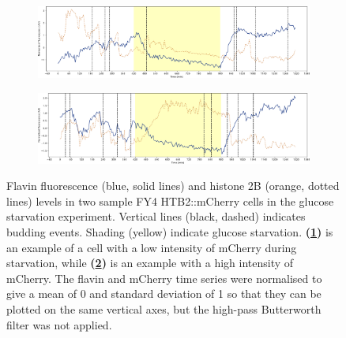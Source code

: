 \begin{figure}
  \centering
  \begin{subfigure}[htpb]{1.0\textwidth}
   \centering
   \includegraphics[width=\textwidth]{starvation_raw_13-39-01.pdf}
   \caption{
   }
   \label{fig:biology-starvation-raw-2}
  \end{subfigure}

  \begin{subfigure}[htpb]{1.0\textwidth}
   \centering
   \includegraphics[width=\textwidth]{starvation_raw_13-07-02.pdf}
   \caption{
   }
   \label{fig:biology-starvation-raw-1}
  \end{subfigure}

  \caption[
    Flavin fluorescence and histone 2B levels in two sample FY4 HTB2::mCherry cells in the glucose starvation experiment.
  ]{
    Flavin fluorescence (blue, solid lines) and histone 2B (orange, dotted lines) levels in two sample FY4 HTB2::mCherry cells in the glucose starvation experiment.
    Vertical lines (black, dashed) indicates budding events.
    Shading (yellow) indicate glucose starvation.
    \textbf{(\ref{fig:biology-starvation-raw-2})} is an example of a cell with a low intensity of mCherry during starvation, while \textbf{(\ref{fig:biology-starvation-raw-1})} is an example with a high intensity of mCherry.
    The flavin and mCherry time series were normalised to give a mean of 0 and standard deviation of 1 so that they can be plotted on the same vertical axes, but the high-pass Butterworth filter was not applied.
  }
  \label{fig:biology-starvation-raw}
\end{figure}


